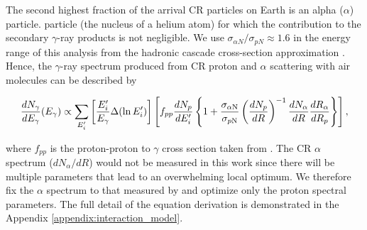 The second highest fraction of the arrival CR particles on 
Earth is an alpha ($\alpha$) particle.
particle (the nucleus of a helium atom) for which the contribution
to the secondary $\gamma$-ray products is not negligible.
We use $\sigma_{\alpha N}/\sigma_{pN}\approx1.6$ in the energy range of this
analysis from the hadronic cascade cross-section approximation
\citep{WAtwater}.
Hence,
the $\gamma$-ray spectrum produced from CR proton and
$\alpha$ scattering with air molecules can be described by

\begin{equation}
    \frac{dN_{\gamma}}{dE_\gamma}(E_\gamma) \propto
    \sum_{E'_i}\left[\frac{E'_i}{E_{\gamma}}\Delta(\ln E'_i) \right]
    \left[ 
        f_{pp}\frac{dN_p}{dE'_i}
        \left\{
            1+\frac{\sigma_{\alpha\rm N}}{\sigma_{p\rm N}}\left(\frac{dN_p}{dR}\right)^{-1} \frac{dN_{\alpha}}{dR} \frac{dR_{\alpha}}{dR_p} 
        \right\}
    \right]
    ,\label{eq:derived_model}
\end{equation}

where $f_{pp}$ is the proton-proton to $\gamma$ cross section taken from
\cite{K&Omodel}. %
The CR
$\alpha$ spectrum ($dN_\alpha/dR$) %
would not be measured in this work
since there will be multiple parameters that lead to an overwhelming 
local optimum.
We therefore fix the $\alpha$ spectrum to that measured
by \cite{AMS-02Helium} and optimize only the proton spectral parameters.
The full detail of the 
equation derivation is demonstrated
in the Appendix \ref{appendix:interaction_model}.



